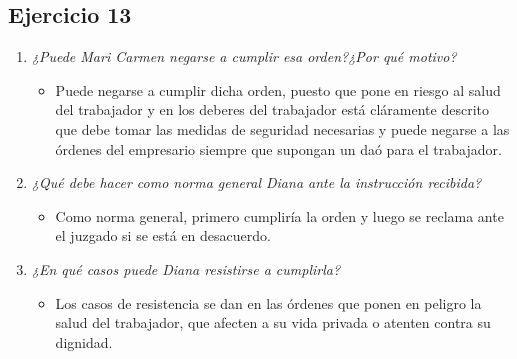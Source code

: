 \documentclass{article}
\begin{document}
      \subsection{Ejercicio 13}
        \begin{enumerate}[label=(\alph*)]
          \item \textit{¿Puede Mari Carmen negarse a cumplir esa orden?¿Por qué motivo?}
            \begin{itemize}
              \item Puede negarse a cumplir dicha orden, puesto que pone en riesgo al salud del trabajador y en los deberes del trabajador está cláramente descrito que 
              debe tomar las medidas de seguridad necesarias y puede negarse a las órdenes del empresario siempre que supongan un daó para el trabajador.
            \end{itemize}
          \item \textit{¿Qué debe hacer como norma general Diana ante la instrucción recibida?}
            \begin{itemize}
              \item Como norma general, primero cumpliría la orden y luego se reclama ante el juzgado si se está en desacuerdo. 
            \end{itemize}
          \item \textit{¿En qué casos puede Diana resistirse a cumplirla?}
            \begin{itemize}
              \item Los casos de resistencia se dan en las órdenes que ponen en peligro la salud del trabajador, que afecten a su vida privada o atenten contra 
              su dignidad.
            \end{itemize}
        \end{enumerate}
\end{document}

